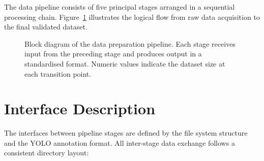 \documentclass[a4paper,12pt,twoside]{report}
\begin{document}
The data pipeline consists of five principal stages arranged in a sequential
processing chain. Figure~\ref{fig:pipeline-block} illustrates the logical flow
from raw data acquisition to the final validated dataset.

\begin{figure}[htbp]
  \centering
  \caption{Block diagram of the data preparation pipeline. Each stage receives
    input from the preceding stage and produces output in a standardised format.
    Numeric values indicate the dataset size at each transition point.}
  \label{fig:pipeline-block}
\end{figure}

\section{Interface Description}
\label{sec:interfaces}

The interfaces between pipeline stages are defined by the file system structure
and the YOLO annotation format. All inter-stage data exchange follows a
consistent directory layout:
\end{document}
